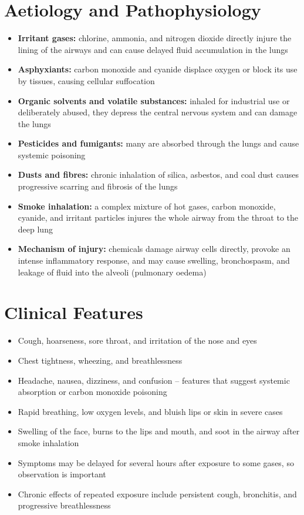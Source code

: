 \section*{Aetiology and Pathophysiology}
\begin{itemize}
    \item \textbf{Irritant gases:} chlorine, ammonia, and nitrogen dioxide directly injure the lining of the airways and can cause delayed fluid accumulation in the lungs
    \item \textbf{Asphyxiants:} carbon monoxide and cyanide displace oxygen or block its use by tissues, causing cellular suffocation
    \item \textbf{Organic solvents and volatile substances:} inhaled for industrial use or deliberately abused, they depress the central nervous system and can damage the lungs
    \item \textbf{Pesticides and fumigants:} many are absorbed through the lungs and cause systemic poisoning
    \item \textbf{Dusts and fibres:} chronic inhalation of silica, asbestos, and coal dust causes progressive scarring and fibrosis of the lungs
    \item \textbf{Smoke inhalation:} a complex mixture of hot gases, carbon monoxide, cyanide, and irritant particles injures the whole airway from the throat to the deep lung
    \item \textbf{Mechanism of injury:} chemicals damage airway cells directly, provoke an intense inflammatory response, and may cause swelling, bronchospasm, and leakage of fluid into the alveoli (pulmonary oedema)
\end{itemize}

\section*{Clinical Features}
\begin{itemize}
    \item Cough, hoarseness, sore throat, and irritation of the nose and eyes
    \item Chest tightness, wheezing, and breathlessness
    \item Headache, nausea, dizziness, and confusion -- features that suggest systemic absorption or carbon monoxide poisoning
    \item Rapid breathing, low oxygen levels, and bluish lips or skin in severe cases
    \item Swelling of the face, burns to the lips and mouth, and soot in the airway after smoke inhalation
    \item Symptoms may be delayed for several hours after exposure to some gases, so observation is important
    \item Chronic effects of repeated exposure include persistent cough, bronchitis, and progressive breathlessness
\end{itemize}

